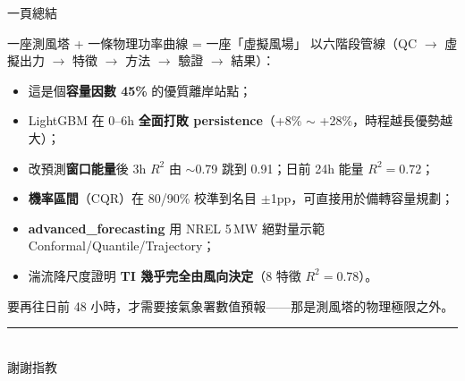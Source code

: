 \documentclass[aspectratio=169,11pt]{beamer}
\begin{document}
\begin{frame}{一頁總結}
  \begin{block}{一座測風塔 + 一條物理功率曲線 = 一座「虛擬風場」}
  \footnotesize
  以六階段管線（QC $\to$ 虛擬出力 $\to$ 特徵 $\to$ 方法 $\to$ 驗證 $\to$ 結果）：
  \begin{itemize}
    \item 這是個\textbf{容量因數 45\%} 的優質離岸站點；
    \item LightGBM 在 0–6h \textbf{全面打敗 persistence}（+8\% $\sim$ +28\%，時程越長優勢越大）；
    \item 改預測\textbf{窗口能量}後 3h $R^2$ 由 $\sim$0.79 跳到 0.91；日前 24h 能量 $R^2{=}0.72$；
    \item \textbf{機率區間}（CQR）在 80/90\% 校準到名目 $\pm$1pp，可直接用於備轉容量規劃；
    \item \textbf{advanced\_forecasting} 用 NREL 5\,MW 絕對量示範 Conformal/Quantile/Trajectory；
    \item 湍流降尺度證明 \textbf{TI 幾乎完全由風向決定}（8 特徵 $R^2{=}0.78$）。
  \end{itemize}
  要再往日前 48 小時，才需要接氣象署數值預報——那是測風塔的物理極限之外。
  \end{block}
  \centering\vspace{2pt}
  {\footnotesize\textcolor{accent}{\rule{0.9\textwidth}{0.4pt}}\\ 謝謝指教}
\end{frame}
\end{document}
